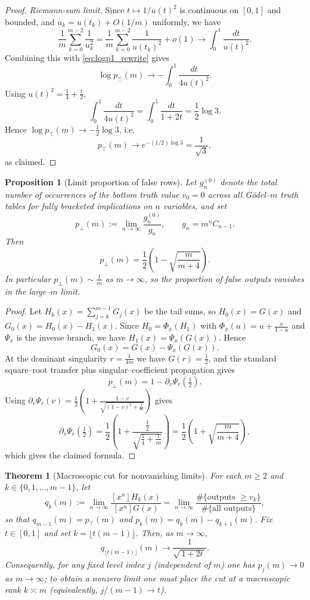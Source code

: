 \documentclass[11pt]{article}
\newtheorem{proposition}{Proposition}
\newtheorem{theorem}{Theorem}
\newcommand{\ptop}{p_{\top}}
\newcommand{\pbot}{p_{\bot}}
\begin{document}
\begin{proof}
\medskip
\noindent
\emph{Riemann-sum limit.}
Since \(t\mapsto 1/u(t)^2\) is continuous on \([0,1]\) and bounded, and \(u_k=u(t_k)+O(1/m)\) uniformly, we have
\[
\frac{1}{m}\sum_{k=0}^{m-2}\frac{1}{u_k^2}
=\frac{1}{m}\sum_{k=0}^{m-2}\frac{1}{u(t_k)^2}+o(1)
\longrightarrow \int_0^1\frac{dt}{u(t)^2}.
\]
Combining this with \eqref{eq:logp1_rewrite} gives
\[
\log \ptop(m)\longrightarrow -\int_0^1\frac{dt}{4u(t)^2}.
\]
Using \(u(t)^2=\frac14+\frac{t}{2}\),
\[
\int_0^1\frac{dt}{4u(t)^2}
=\int_0^1\frac{dt}{1+2t}
=\frac12\log 3.
\]
Hence \(\log \ptop(m)\to -\frac12\log 3\), i.e.
\[
\ptop(m)\to e^{-(1/2)\log 3}=\frac{1}{\sqrt3},
\]
as claimed.
\end{proof}


\begin{proposition}[Limit proportion of false rows]\label{prop:p0m}
Let \(g_n^{(0)}\) denote the total number of occurrences of the bottom truth value \(v_0=0\)
across all Gödel--\(m\) truth tables for fully bracketed implications on \(n\) variables, and set
\[
\pbot(m):=\lim_{n\to\infty}\frac{g_n^{(0)}}{g_n},\qquad g_n=m^nC_{n-1}.
\]
Then
\[
\boxed{\;
\pbot(m)=\frac12\left(1-\sqrt{\frac{m}{m+4}}\right).
\;}
\]
In particular \(\pbot(m)\sim \frac{1}{m}\) as \(m\to\infty\), so the proportion of false outputs
vanishes in the large--\(m\) limit.
\end{proposition}

\begin{proof}
Let \(H_k(x)=\sum_{j=k}^{m-1}G_j(x)\) be the tail sums, so \(H_0(x)=G(x)\) and \(G_0(x)=H_0(x)-H_1(x)\).
Since \(H_0=\Phi_x(H_1)\) with \(\Phi_x(u)=u+\frac{x}{1-u}\) and \(\Psi_x\) is the inverse branch,
we have \(H_1(x)=\Psi_x(G(x))\). Hence
\[
G_0(x)=G(x)-\Psi_x(G(x)).
\]
At the dominant singularity \(r=\frac{1}{4m}\) we have \(G(r)=\frac12\), and the standard
square--root transfer plus singular--coefficient propagation gives
\[
\pbot(m)=1-\partial_v\Psi_r\!\left(\tfrac12\right).
\]
Using \(\partial_v\Psi_r(v)=\frac12\left(1+\frac{1-v}{\sqrt{(1-v)^2+\frac{1}{m}}}\right)\) gives
\[
\partial_v\Psi_r\!\left(\tfrac12\right)=\frac12\left(1+\frac{\tfrac12}{\sqrt{\tfrac14+\tfrac1m}}\right)
=\frac12\left(1+\sqrt{\frac{m}{m+4}}\right),
\]
which gives the claimed formula.
\end{proof}


\begin{theorem}[Macroscopic cut for nonvanishing limits]\label{thm:cut}
For each \(m\ge2\) and \(k\in\{0,1,\dots,m-1\}\), let
\[
q_k(m):=\lim_{n\to\infty}\frac{[x^n]H_k(x)}{[x^n]G(x)}
=\lim_{n\to\infty}\frac{\#\{\text{outputs }\ge v_k\}}{\#\{\text{all outputs}\}},
\]
so that \(q_{m-1}(m)=\ptop(m)\) and \(p_k(m)=q_k(m)-q_{k+1}(m)\).
Fix \(t\in[0,1]\) and set \(k=\lfloor t(m-1)\rfloor\).  Then, as \(m\to\infty\),
\[
\boxed{\;\;
q_{\lfloor t(m-1)\rfloor}(m)\longrightarrow \frac{1}{\sqrt{\,1+2t\,}}.
\;\;}
\]
Consequently, for any \emph{fixed} level index \(j\) (independent of \(m\)) one has
\(p_j(m)\to0\) as \(m\to\infty\); to obtain a nonzero limit one must place the cut at
a \emph{macroscopic rank} \(k\asymp m\) (equivalently, \(j/(m-1)\to t\)).
\end{theorem}
\end{document}
